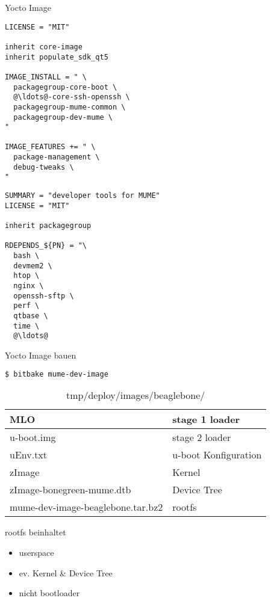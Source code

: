 
\begin{frame}[fragile]{Yocto Image}
	\begin{multicols}{2}
		\begin{lstlisting}[title=mume-dev-image.bb,frame=single,language=bitbake]
LICENSE = "MIT"

inherit core-image
inherit populate_sdk_qt5

IMAGE_INSTALL = " \
  packagegroup-core-boot \
  @\ldots@-core-ssh-openssh \
  packagegroup-mume-common \
  packagegroup-dev-mume \
"

IMAGE_FEATURES += " \
  package-management \
  debug-tweaks \
"
		\end{lstlisting}
		\begin{lstlisting}[title=packagegroup-dev-mume.bb, frame=single, numbers=right, language=bitbake]
SUMMARY = "developer tools for MUME"
LICENSE = "MIT"

inherit packagegroup

RDEPENDS_${PN} = "\
  bash \
  devmem2 \
  htop \
  nginx \
  openssh-sftp \
  perf \
  qtbase \
  time \
  @\ldots@
		\end{lstlisting}
	\end{multicols}
\end{frame}

\begin{frame}[fragile]{Yocto Image bauen}
	\begin{lstlisting}[frame=single,language=bash]
$ bitbake mume-dev-image
	\end{lstlisting}
	\begin{table}
		\caption{tmp/deploy/images/beaglebone/}
		\begin{tabular}{ll}
			\hline MLO & stage 1 loader \\ 
			\hline u-boot.img & stage 2 loader \\ 
			\hline uEnv.txt & u-boot Konfiguration \\ 
			\hline zImage & Kernel \\ 
			\hline zImage-bonegreen-mume.dtb & Device Tree \\ 
			\hline mume-dev-image-beaglebone.tar.bz2 & rootfs \\ 
			\hline 
		\end{tabular} 
	\end{table}
\end{frame}

\begin{frame}{rootfs}
	beinhaltet
	\begin{itemize}
		\item userspace
		\item ev. Kernel \& Device Tree
		\item nicht bootloader
	\end{itemize}
\end{frame}

